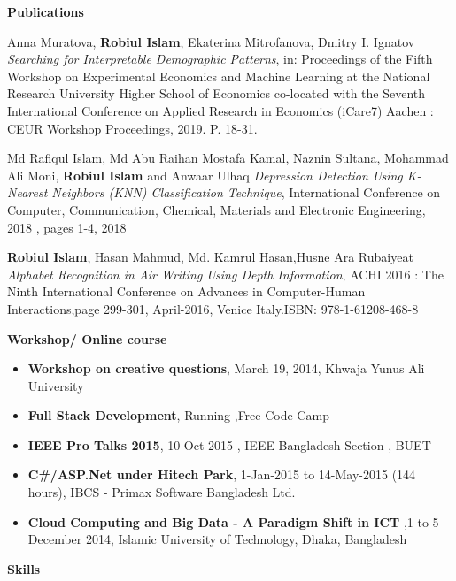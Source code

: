 \documentclass[letterpaper,10pt]{article}
\newcommand{\resitem}[1]{\item #1 \vspace{-2pt}}
\newcommand{\resheading}[1]{{\large \colorbox{mygrey}{\begin{minipage}{\textwidth}{\textbf{#1 \vphantom{p\^{E}}}}\end{minipage}}}}
\begin{document}
\resheading{Publications}
\begin{thebibliography}{}


\bibitem{}
Anna Muratova, \textbf{Robiul Islam}, Ekaterina Mitrofanova, Dmitry I. Ignatov \emph{Searching for Interpretable Demographic Patterns}, in: Proceedings of the Fifth Workshop on Experimental Economics and Machine Learning at the National Research University Higher School of Economics co-located with the Seventh International Conference on Applied Research in Economics (iCare7) Aachen : CEUR Workshop Proceedings, 2019. P. 18-31.

\bibitem{}
Md Rafiqul Islam, Md Abu Raihan Mostafa Kamal, Naznin Sultana, Mohammad Ali Moni, \textbf{Robiul Islam} and Anwaar Ulhaq \emph{Depression Detection Using K-Nearest Neighbors (KNN) Classification Technique}, International Conference on Computer, Communication, Chemical, Materials and Electronic Engineering, 2018 , pages 1-4, 2018  

\bibitem{}
\textbf{Robiul Islam}, Hasan Mahmud, Md. Kamrul Hasan,Husne Ara Rubaiyeat \emph{Alphabet Recognition in Air Writing Using Depth Information}, ACHI 2016 : The Ninth International Conference on Advances in Computer-Human Interactions,page 299-301, April-2016, Venice Italy.ISBN: 978-1-61208-468-8

\end{thebibliography}
\resheading{Workshop/ Online course }
\begin{itemize}

\resitem{\textbf{Workshop on creative questions}, March 19, 2014, Khwaja Yunus Ali University }
\resitem{\textbf{Full Stack Development}, Running ,Free Code Camp}
\resitem{\textbf{IEEE Pro Talks 2015}, 10-Oct-2015 , IEEE Bangladesh Section , BUET }
\resitem{\textbf{C\#/ASP.Net under Hitech Park}, 1-Jan-2015 to 14-May-2015 (144 hours), IBCS - Primax Software
Bangladesh Ltd.}
\resitem{\textbf{Cloud Computing and Big Data - A Paradigm Shift in ICT} ,1 to 5 December 2014, Islamic University of Technology, Dhaka, Bangladesh}
\end{itemize}






\resheading{Skills}
\end{document}
